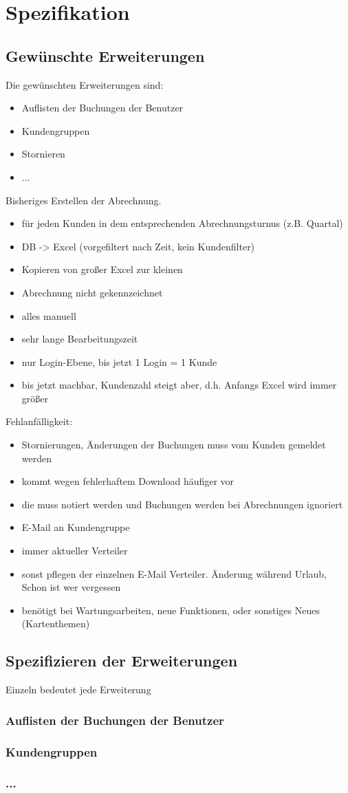 \chapter{Spezifikation}
\section{Gewünschte Erweiterungen}
Die gewünschten Erweiterungen sind:
\begin{itemize}
	\item Auflisten der Buchungen der Benutzer
	\item Kundengruppen
	\item Stornieren
	\item ...
\end{itemize}

Bisheriges Erstellen der Abrechnung.
\begin{itemize}
	\item für jeden Kunden in dem entsprechenden Abrechnungsturnus (z.B. Quartal)
	\item DB -> Excel (vorgefiltert nach Zeit, kein Kundenfilter)
	\item Kopieren von großer Excel zur kleinen
	\item Abrechnung nicht gekennzeichnet
	\item alles manuell
	\item sehr lange Bearbeitungszeit
	\item nur Login-Ebene, bis jetzt 1 Login = 1 Kunde
	\item bis jetzt machbar, Kundenzahl steigt aber, d.h. Anfangs Excel wird immer größer
\end{itemize}

Fehlanfälligkeit:
\begin{itemize}
	\item Stornierungen, Änderungen der Buchungen muss vom Kunden gemeldet werden
	\item kommt wegen fehlerhaftem Download häufiger vor
	\item die muss notiert werden und Buchungen werden bei Abrechnungen ignoriert
\end{itemize}

\begin{itemize}
	\item E-Mail an Kundengruppe
	\item immer aktueller Verteiler
	\item sonst pflegen der einzelnen E-Mail Verteiler. Änderung während Urlaub, Schon ist wer vergessen
	\item benötigt bei Wartungsarbeiten, neue Funktionen, oder sonstiges Neues (Kartenthemen)
\end{itemize}

\section{Spezifizieren der Erweiterungen}
Einzeln bedeutet jede Erweiterung
\subsection{Auflisten der Buchungen der Benutzer}
\subsection{Kundengruppen}
\subsection{...}

